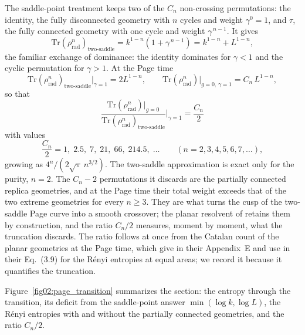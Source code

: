 \documentclass[11pt,letterpaper]{article}
\theoremstyle{plain}
\theoremstyle{definition}
\theoremstyle{remark}
\begin{document}
The saddle-point treatment keeps two of the $C_n$ non-crossing permutations: the identity, the fully disconnected geometry with $n$ cycles and weight $\gamma^0 = 1$, and $\tau$, the fully connected geometry with one cycle and weight $\gamma^{\,n-1}$. It gives
\begin{equation}
\label{eq02:two_saddle}
\mathrm{Tr}(\rho_{\mathrm{rad}}^n)_{\text{two-saddle}} = k^{1-n}(1 + \gamma^{\,n-1}) = k^{1-n} + L^{1-n},
\end{equation}
the familiar exchange of dominance: the identity dominates for $\gamma < 1$ and the cyclic permutation for $\gamma > 1$. At the Page time
\begin{equation}
\label{eq02:two_saddle_page}
\mathrm{Tr}(\rho_{\mathrm{rad}}^n)_{\text{two-saddle}}\big|_{\gamma=1} = 2 L^{1-n},
\qquad
\mathrm{Tr}(\rho_{\mathrm{rad}}^n)\big|_{g=0,\,\gamma=1} = C_n \, L^{1-n},
\end{equation}
so that
\begin{equation}
\label{eq02:catalan_ratio}
\boxed{\frac{\mathrm{Tr}(\rho_{\mathrm{rad}}^n)\big|_{g=0}}{\mathrm{Tr}(\rho_{\mathrm{rad}}^n)_{\text{two-saddle}}}\Bigg|_{\gamma=1} = \frac{C_n}{2}}
\end{equation}
with values
\begin{equation}
\label{eq02:ratio_values}
\frac{C_n}{2} = 1,\; 2.5,\; 7,\; 21,\; 66,\; 214.5,\; \ldots \qquad (n = 2, 3, 4, 5, 6, 7, \ldots),
\end{equation}
growing as $4^n/(2\sqrt{\pi}\, n^{3/2})$. The two-saddle approximation is exact only for the purity, $n = 2$. The $C_n - 2$ permutations it discards are the partially connected replica geometries, and at the Page time their total weight exceeds that of the two extreme geometries for every $n \geq 3$. They are what turns the cusp of the two-saddle Page curve into a smooth crossover; the planar resolvent of \citet{pssyetal2022} retains them by construction, and the ratio $C_n/2$ measures, moment by moment, what the truncation discards. The ratio follows at once from the Catalan count of the planar geometries at the Page time, which \citet{pssyetal2022} give in their Appendix~E and \citet{marolfwangwang2020} use in their Eq.~(3.9) for the R\'enyi entropies at equal areas; we record it because it quantifies the truncation.


Figure~\ref{fig02:page_transition} summarizes the section: the entropy through the transition, its deficit from the saddle-point answer $\min(\log k, \log L)$, the R\'enyi entropies with and without the partially connected geometries, and the ratio $C_n/2$.
\end{document}
